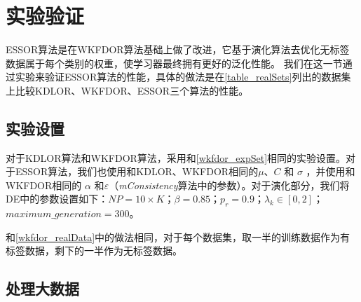 \section{实验验证}
ESSOR算法是在WKFDOR算法基础上做了改进，它基于演化算法去优化无标签数据属于每个类别的权重，使学习器最终拥有更好的泛化性能。 我们在这一节通过实验来验证ESSOR算法的性能，具体的做法是在\autoref{table_realSets}列出的数据集上比较KDLOR、WKFDOR、ESSOR三个算法的性能。

\subsection{实验设置}
对于KDLOR算法和WKFDOR算法，采用和\autoref{wkfdor_expSet}相同的实验设置。对于ESSOR算法，我们也使用和KDLOR、WKFDOR相同的\(\mu\)、\(C\) 和 \(\sigma\) ，并使用和WKFDOR相同的 \(\alpha\) 和\(\varepsilon\)（\textit{mConsistency}算法中的参数）。对于演化部分，我们将DE中的参数设置如下：\(NP = 10 \times K\)；\(\beta = 0.85\)；\(p_{r} = 0.9\)；\(\lambda_{k} \in [0,2]\)；\(maximum\_generation = 300\)。


和\autoref{wkfdor_realData}中的做法相同，对于每个数据集，取一半的训练数据作为有标签数据，剩下的一半作为无标签数据。

\subsection{处理大数据}

